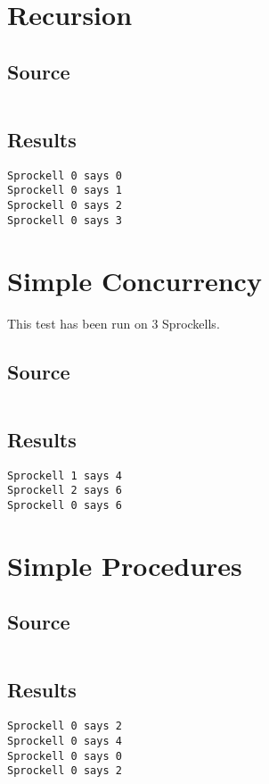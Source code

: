 \documentclass[twoside]{report}
\begin{document}
\section{Recursion}
\subsection{Source}
\inputminted[tabsize=4,linenos,firstnumber=1]{text}{../../src/haskell/PP-project-2017/test/recursion.shl}
\subsection{Results}
\begin{verbatim}
Sprockell 0 says 0
Sprockell 0 says 1
Sprockell 0 says 2
Sprockell 0 says 3
\end{verbatim}

\section{Simple Concurrency}
This test has been run on 3 Sprockells.
\subsection{Source}
\inputminted[tabsize=4,linenos,firstnumber=1]{text}{../../src/haskell/PP-project-2017/test/simple_concurrency.shl}
\subsection{Results}
\begin{verbatim}
Sprockell 1 says 4
Sprockell 2 says 6
Sprockell 0 says 6
\end{verbatim}

\section{Simple Procedures}
\subsection{Source}
\inputminted[tabsize=4,linenos,firstnumber=1]{text}{../../src/haskell/PP-project-2017/test/simple_proc.shl}
\subsection{Results}
\begin{verbatim}
Sprockell 0 says 2
Sprockell 0 says 4
Sprockell 0 says 0
Sprockell 0 says 2
\end{verbatim}
\end{document}
